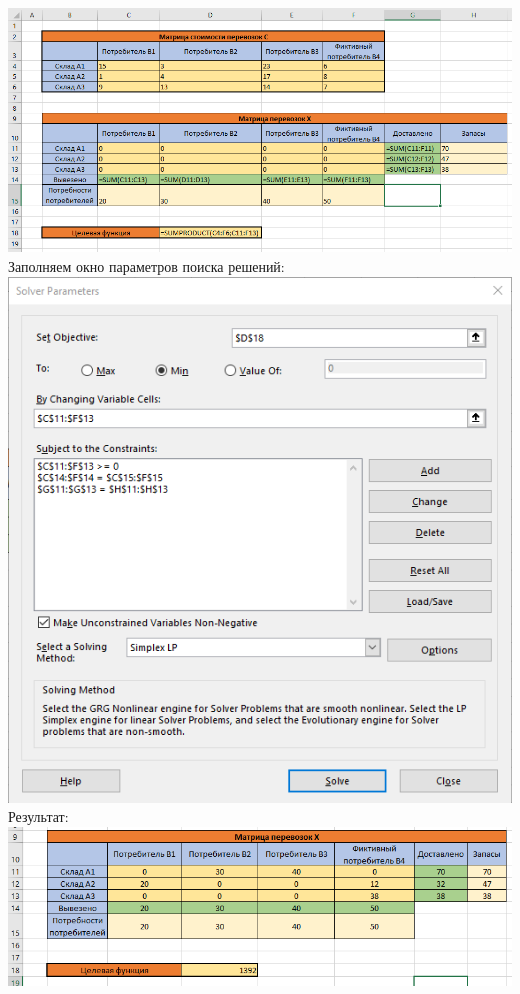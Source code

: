 \documentclass[a4paper, 12pt]{article}
\begin{document}
\includegraphics[width=\textwidth]{2-3.png}\\

\newpage
Заполняем окно параметров поиска решений:\\

\includegraphics{2-4.png}\\

Результат: \\

\includegraphics[width=\textwidth]{2-5.png}\\
\end{document}
